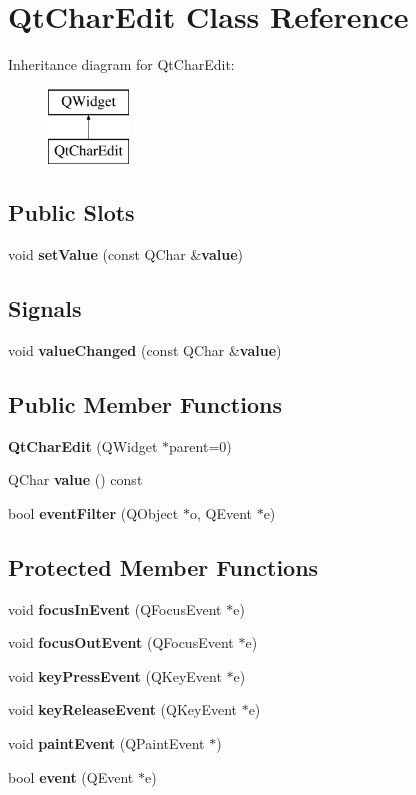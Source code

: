 \section{Qt\+Char\+Edit Class Reference}
\label{classQtCharEdit}
Inheritance diagram for Qt\+Char\+Edit\+:\begin{figure}[H]
\begin{center}
\leavevmode
\includegraphics[height=2.000000cm]{classQtCharEdit}
\end{center}
\end{figure}
\subsection*{Public Slots}
\begin{DoxyCompactItemize}
\item 
void {\bf set\+Value} (const Q\+Char \&{\bf value})
\end{DoxyCompactItemize}
\subsection*{Signals}
\begin{DoxyCompactItemize}
\item 
void {\bf value\+Changed} (const Q\+Char \&{\bf value})
\end{DoxyCompactItemize}
\subsection*{Public Member Functions}
\begin{DoxyCompactItemize}
\item 
{\bf Qt\+Char\+Edit} (Q\+Widget $\ast$parent=0)
\item 
Q\+Char {\bf value} () const 
\item 
bool {\bf event\+Filter} (Q\+Object $\ast$o, Q\+Event $\ast$e)
\end{DoxyCompactItemize}
\subsection*{Protected Member Functions}
\begin{DoxyCompactItemize}
\item 
void {\bf focus\+In\+Event} (Q\+Focus\+Event $\ast$e)
\item 
void {\bf focus\+Out\+Event} (Q\+Focus\+Event $\ast$e)
\item 
void {\bf key\+Press\+Event} (Q\+Key\+Event $\ast$e)
\item 
void {\bf key\+Release\+Event} (Q\+Key\+Event $\ast$e)
\item 
void {\bf paint\+Event} (Q\+Paint\+Event $\ast$)
\item 
bool {\bf event} (Q\+Event $\ast$e)
\end{DoxyCompactItemize}


